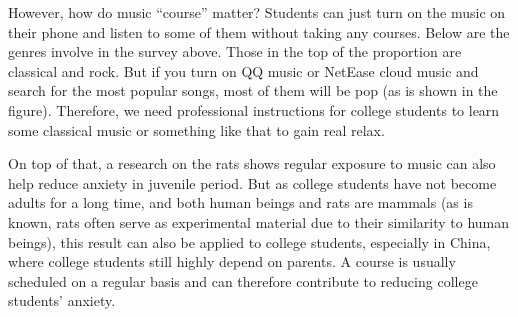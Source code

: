 However, how do music “course” matter? Students can just turn on the music on their phone and listen to some of them without taking any courses. Below are the genres involve in the survey above. Those in the top of the proportion are classical and rock. But if you turn on QQ music or NetEase cloud music and search for the most popular songs, most of them will be pop (as is shown in the figure). Therefore, we need professional instructions for college students to learn some classical music or something like that to gain real relax.\par
On top of that, a research on the rats shows regular exposure to music can also help reduce anxiety in juvenile period. But as college students have not become adults for a long time, and both human beings and rats are mammals (as is known, rats often serve as experimental material due to their similarity to human beings), this result can also be applied to college students, especially in China, where college students still highly depend on parents. A course is usually scheduled on a regular basis and can therefore contribute to reducing college students’ anxiety.\par

